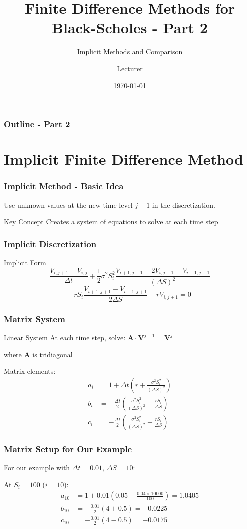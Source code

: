 \documentclass[aspectratio=169]{beamer}
\title{Finite Difference Methods for Black-Scholes - Part 2}
\subtitle{Implicit Methods and Comparison}
\author{Lecturer}
\date{\today}
\begin{document}
\begin{frame}
\titlepage
\end{frame}

\begin{frame}
\frametitle{Outline - Part 2}
\tableofcontents
\end{frame}

\section{Implicit Finite Difference Method}

\begin{frame}
\frametitle{Implicit Method - Basic Idea}
Use unknown values at the new time level \(j+1\) in the discretization.

\begin{block}{Key Concept}
Creates a system of equations to solve at each time step
\end{block}
\end{frame}

\begin{frame}
\frametitle{Implicit Discretization}
\begin{block}{Implicit Form}
\[\frac{V_{i,j+1} - V_{i,j}}{\Delta t} + \frac{1}{2}\sigma^2 S_i^2 \frac{V_{i+1,j+1} - 2V_{i,j+1} + V_{i-1,j+1}}{(\Delta S)^2}\]
\[+ rS_i \frac{V_{i+1,j+1} - V_{i-1,j+1}}{2\Delta S} - rV_{i,j+1} = 0\]
\end{block}
\end{frame}

\begin{frame}
\frametitle{Matrix System}
\begin{block}{Linear System}
At each time step, solve: \(\mathbf{A} \cdot \mathbf{V}^{j+1} = \mathbf{V}^j\)

where \(\mathbf{A}\) is tridiagonal
\end{block}

Matrix elements:
\begin{align}
a_i &= 1 + \Delta t \left( r + \frac{\sigma^2 S_i^2}{(\Delta S)^2} \right) \\
b_i &= -\frac{\Delta t}{2} \left( \frac{\sigma^2 S_i^2}{(\Delta S)^2} + \frac{rS_i}{\Delta S} \right) \\
c_i &= -\frac{\Delta t}{2} \left( \frac{\sigma^2 S_i^2}{(\Delta S)^2} - \frac{rS_i}{\Delta S} \right)
\end{align}
\end{frame}

\begin{frame}
\frametitle{Matrix Setup for Our Example}
For our example with \(\Delta t = 0.01\), \(\Delta S = 10\):

At \(S_i = 100\) (\(i = 10\)):
\begin{align}
a_{10} &= 1 + 0.01(0.05 + \frac{0.04 \times 10000}{100}) = 1.0405 \\
b_{10} &= -\frac{0.01}{2}(4 + 0.5) = -0.0225 \\
c_{10} &= -\frac{0.01}{2}(4 - 0.5) = -0.0175
\end{align}
\end{frame}
\end{document}
